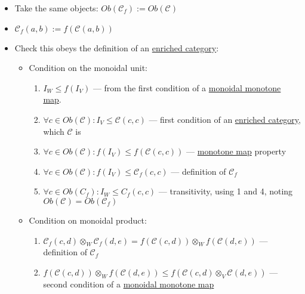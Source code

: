 \begin{itemize}
    \item Take the same objects: $Ob(\mathcal{C}_f):=Ob(\mathcal{C})$
    \item $\mathcal{C}_f(a,b) := f(\mathcal{C}(a,b))$
    \item Check this obeys the definition of an \href{doc/1 math/Seven Sketches in Compositionality/Chapter 2: Resource theories/3 Enrichment/1 V-categories/1 V-category}{enriched category}:
          \begin{itemize}
            \item Condition on the monoidal unit:
                  \begin{enumerate}
                    \item $I_W \leq f(I_V)$ --- from the first condition of a \href{doc/1 math/Seven Sketches in Compositionality/Chapter 2: Resource theories/2 Symmetric monoidal preorders/5 Monoidal monotone maps/1 Monoidal monotone}{monoidal monotone map}.
                    \item $\forall c \in Ob(\mathcal{C}): I_V \leq \mathcal{C}(c,c)$ --- first condition of an \href{doc/1 math/Seven Sketches in Compositionality/Chapter 2: Resource theories/3 Enrichment/1 V-categories/1 V-category}{enriched category}, which $\mathcal{C}$ is
                    \item $\forall c \in Ob(\mathcal{C}):f(I_V) \leq f(\mathcal{C}(c,c))$ --- \href{doc/1 math/Seven Sketches in Compositionality/Chapter 1: Generative Effects/4 Monotone maps/1 Monotone map}{monotone map} property
                    \item $\forall c \in Ob(\mathcal{C}):f(I_V) \leq \mathcal{C}_f(c,c)$ --- definition of $\mathcal{C}_f$
                    \item $\forall c \in Ob(C_f): I_W \leq C_f(c,c)$ --- transitivity, using 1 and 4, noting $Ob(\mathcal{C})=Ob(\mathcal{C}_f)$
                  \end{enumerate}
            \item Condition on monoidal product:
                  \begin{enumerate}
                    \item $\mathcal{C}_f(c,d) \otimes_W \mathcal{C}_f(d,e) = f(\mathcal{C}(c,d)) \otimes_W f(\mathcal{C}(d,e))$ --- definition of $\mathcal{C}_f$
                    \item $f(\mathcal{C}(c,d)) \otimes_W f(\mathcal{C}(d,e)) \leq f(\mathcal{C}(c,d) \otimes_V \mathcal{C}(d,e))$  --- second condition of a \href{doc/1 math/Seven Sketches in Compositionality/Chapter 2: Resource theories/2 Symmetric monoidal preorders/5 Monoidal monotone maps/1 Monoidal monotone}{monoidal monotone map}

\end{enumerate}
\end{itemize}
\end{itemize}
